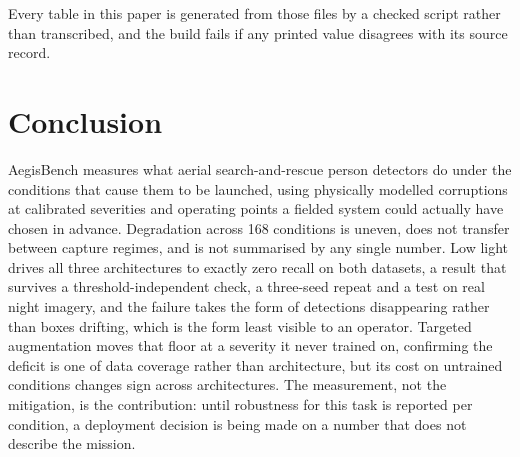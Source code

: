 Every table in this paper is generated from those files by a checked
script rather than transcribed, and the build fails if any printed value
disagrees with its source record.

\section{Conclusion}

AegisBench measures what aerial search-and-rescue person detectors do
under the conditions that cause them to be launched, using physically
modelled corruptions at calibrated severities and operating points a
fielded system could actually have chosen in advance. Degradation across
168 conditions is uneven, does not transfer between capture regimes, and
is not summarised by any single number. Low light drives all three
architectures to exactly zero recall on both datasets, a result that
survives a threshold-independent check, a three-seed repeat and a test
on real night imagery, and the failure takes the form of detections
disappearing rather than boxes drifting, which is the form least visible
to an operator. Targeted augmentation moves that floor at a severity it
never trained on, confirming the deficit is one of data coverage rather
than architecture, but its cost on untrained conditions changes sign
across architectures. The measurement, not the mitigation, is the
contribution: until robustness for this task is reported per condition,
a deployment decision is being made on a number that does not describe
the mission.
